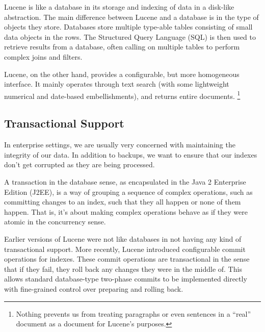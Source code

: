 Lucene is like a database in its storage and indexing of data in a
disk-like abstraction.  The main difference between Lucene and a
database is in the type of objects they store.  Databases store
multiple type-able tables consisting of small data objects in the
rows.  The Structured Query Language (SQL) is then used to retrieve
results from a database, often calling on multiple tables to perform
complex joins and filters.  

Lucene, on the other hand, provides a configurable, but more
homogeneous interface.  It mainly operates through text search (with
some lightweight numerical and date-based embellishments), and
returns entire documents.%
%
\footnote{Nothing prevents us from treating paragraphs or even sentences in a
``real'' document as a document for Lucene's purposes.}

\subsection{Transactional Support}

In enterprise settings, we are usually very concerned with maintaining
the integrity of our data.  In addition to backups, we want to ensure
that our indexes don't get corrupted as they are being processed.

A transaction in the database sense, as encapsulated in the Java 2
Enterprise Edition (J2EE), is a way of grouping a sequence of complex
operations, such as committing changes to an index, such that they all
happen or none of them happen.  That is, it's about making complex
operations behave as if they were atomic in the concurrency sense.

Earlier versions of Lucene were not like databases in not having any
kind of transactional support.  More recently, Lucene introduced
configurable commit operations for indexes.  These commit operations
are transactional in the sense that if they fail, they roll back any
changes they were in the middle of.  This allows standard
database-type two-phase commits to be implemented directly with
fine-grained control over preparing and rolling back.

 







